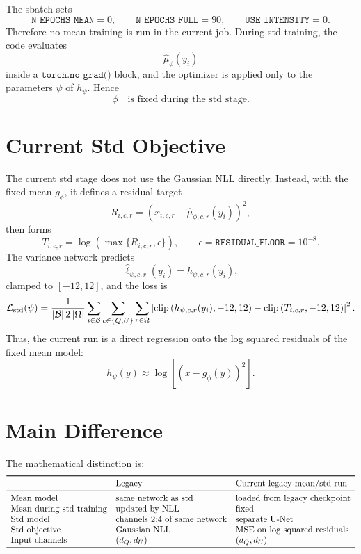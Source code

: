 \documentclass[11pt]{article}
\newcommand{\mean}{\mu}
\newcommand{\logvar}{\ell}
\newcommand{\pix}{r}
\newcommand{\chan}{c}
\newcommand{\grid}{\Omega}
\newcommand{\batch}{\mathcal{B}}
\begin{document}
The sbatch sets
\[
  \texttt{N\_EPOCHS\_MEAN}=0,
  \qquad
  \texttt{N\_EPOCHS\_FULL}=90,
  \qquad
  \texttt{USE\_INTENSITY}=0.
\]
Therefore no mean training is run in the current job.  During std training,
the code evaluates
\[
  \widehat{\mean}_{\phi}(y_i)
\]
inside a \(\texttt{torch.no\_grad()}\) block, and the optimizer is applied only
to the parameters \(\psi\) of \(h_\psi\).  Hence
\[
  \phi \quad\text{is fixed during the std stage}.
\]

\section{Current Std Objective}

The current std stage does not use the Gaussian NLL directly.  Instead, with
the fixed mean \(g_\phi\), it defines a residual target
\[
  R_{i,\chan,\pix}
  =
  \left(
    x_{i,\chan,\pix}
    -
    \widehat{\mean}_{\phi,\chan,\pix}(y_i)
  \right)^2,
\]
then forms
\[
  T_{i,\chan,\pix}
  =
  \log\left(
    \max\{R_{i,\chan,\pix},\epsilon\}
  \right),
  \qquad
  \epsilon=\texttt{RESIDUAL\_FLOOR}=10^{-8}.
\]
The variance network predicts
\[
  \widehat{\logvar}_{\psi,\chan,\pix}(y_i)
  =
  h_{\psi,\chan,\pix}(y_i),
\]
clamped to \([-12,12]\), and the loss is
\[
  \mathcal{L}_{\rm std}(\psi)
  =
  \frac{1}{|\batch|\,2\,|\grid|}
  \sum_{i\in\batch}
  \sum_{\chan\in\{Q,U\}}
  \sum_{\pix\in\grid}
  \left[
    \operatorname{clip}
    \left(
      h_{\psi,\chan,\pix}(y_i),-12,12
    \right)
    -
    \operatorname{clip}
    \left(
      T_{i,\chan,\pix},-12,12
    \right)
  \right]^2.
\]
Thus, the current run is a direct regression onto the log squared residuals of
the fixed mean model:
\[
  h_\psi(y)
  \approx
  \log\left[
    \left(x-g_\phi(y)\right)^2
  \right].
\]

\section{Main Difference}

The mathematical distinction is:
\[
\begin{array}{lll}
\toprule
 & \text{Legacy} & \text{Current legacy-mean/std run} \\
\midrule
\text{Mean model} &
\text{same network as std} &
\text{loaded from legacy checkpoint} \\
\text{Mean during std training} &
\text{updated by NLL} &
\text{fixed} \\
\text{Std model} &
\text{channels 2:4 of same network} &
\text{separate U-Net} \\
\text{Std objective} &
\text{Gaussian NLL} &
\text{MSE on log squared residuals} \\
\text{Input channels} &
(d_Q,d_U) &
(d_Q,d_U) \\
\bottomrule
\end{array}
\]
\end{document}
